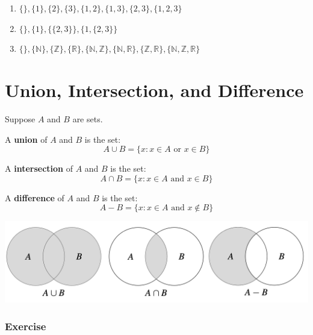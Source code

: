 \documentclass[
  letterpaper,
  DIV=11,
  numbers=noendperiod]{scrreprt}
\providecommand{\tightlist}{%
  \setlength{\itemsep}{0pt}\setlength{\parskip}{0pt}}\usepackage{longtable,booktabs,array}
\begin{document}
\begin{tcolorbox}[enhanced jigsaw, toprule=.15mm, leftrule=.75mm, coltitle=black, left=2mm, opacityback=0, titlerule=0mm, arc=.35mm, toptitle=1mm, opacitybacktitle=0.6, bottomtitle=1mm, colframe=quarto-callout-tip-color-frame, title=\textcolor{quarto-callout-tip-color}{\faLightbulb}\hspace{0.5em}{Solution}, rightrule=.15mm, bottomrule=.15mm, colbacktitle=quarto-callout-tip-color!10!white, breakable, colback=white]

\begin{enumerate}
\def\labelenumi{\arabic{enumi}.}
\tightlist
\item
  \(\{\}, \{1\}, \{2\}, \{3\}, \{1,2\}, \{1,3\}, \{2,3\}, \{1,2,3\}\)
\item
  \(\{\}, \{1\}, \{\{2,3\}\}, \{1,\{2,3\}\}\)
\item
  \(\{\}, \{\mathbb{N}\}, \{\mathbb{Z}\}, \{\mathbb{R}\}, \{\mathbb{N},\mathbb{Z}\}, \{\mathbb{N},\mathbb{R}\}, \{\mathbb{Z},\mathbb{R}\}, \{\mathbb{N},\mathbb{Z},\mathbb{R}\}\)
\end{enumerate}

\end{tcolorbox}

\section{Union, Intersection, and
Difference}\label{union-intersection-and-difference}

Suppose \(A\) and \(B\) are sets.

A \textbf{union} of \(A\) and \(B\) is the set: \[
A \cup B = \{x: x \in A \text{ or } x \in B \}
\]

A \textbf{intersection} of \(A\) and \(B\) is the set: \[
A \cap B = \{x: x \in A \text{ and } x \in B \}
\]

A \textbf{difference} of \(A\) and \(B\) is the set: \[
A - B = \{x: x \in A \text{ and } x \notin B \}
\]

\includegraphics[width=0.75\linewidth,height=\textheight,keepaspectratio]{lecture2/images/union-intersection-complement.png}

\subsubsection{Exercise}\label{exercise-2}
\end{document}
